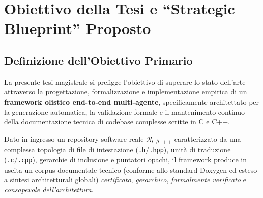 \section{Obiettivo della Tesi e ``Strategic Blueprint'' Proposto}
\label{sec:intro_blueprint}

\subsection{Definizione dell'Obiettivo Primario}
\label{subsec:obiettivo_tesi}
La presente tesi magistrale si prefigge l'obiettivo di superare lo stato dell'arte attraverso la progettazione, formalizzazione e implementazione empirica di un \textbf{framework olistico end-to-end multi-agente}, specificamente architettato per la generazione automatica, la validazione formale e il mantenimento continuo della documentazione tecnica di codebase complesse scritte in C e C++.

Dato in ingresso un repository software reale $\mathcal{R}_{\mathrm{C/C++}}$ caratterizzato da una complessa topologia di file di intestazione (\texttt{.h}/\texttt{.hpp}), unità di traduzione (\texttt{.c}/\texttt{.cpp}), gerarchie di inclusione e puntatori opachi, il framework produce in uscita un corpus documentale tecnico (conforme allo standard Doxygen ed esteso a sintesi architetturali globali) \emph{certificato}, \emph{gerarchico}, \emph{formalmente verificato} e \emph{consapevole dell'architettura}.

